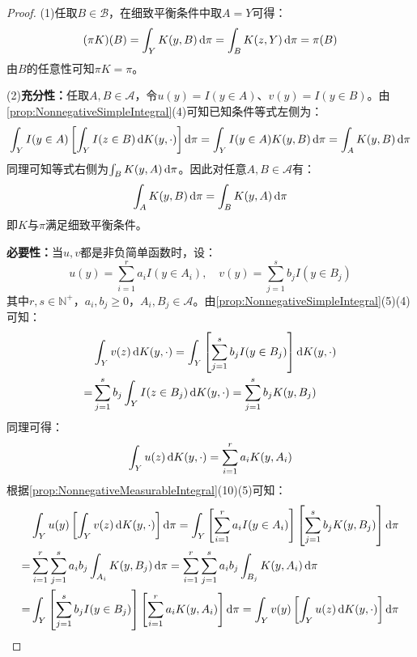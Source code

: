\begin{proof}
	(1)任取$B\in\mathscr{B}$，在细致平衡条件中取$A=Y$可得：
	\begin{equation*}
		(\pi K)(B)=\int_{Y}K(y,B)\mathop{}\!\mathrm{d}\pi=\int_{B}K(z,Y)\mathop{}\!\mathrm{d}\pi=\pi(B)
	\end{equation*}
	由$B$的任意性可知$\pi K=\pi$。\par
	(2)\textbf{充分性：}任取$A,B\in\mathscr{A}$，令$u(y)=I(y\in A)$、$v(y)=I(y\in B)$。由\cref{prop:NonnegativeSimpleIntegral}(4)可知已知条件等式左侧为：
	\begin{equation*}
		\int_{Y}I(y\in A)\left[\int_{Y}I(z\in B)\mathop{}\!\mathrm{d} K(y,\cdot)\right]\mathop{}\!\mathrm{d}\pi=\int_{Y}I(y\in A)K(y,B)\mathop{}\!\mathrm{d}\pi=\int_{A}K(y,B)\mathop{}\!\mathrm{d}\pi
	\end{equation*}
	同理可知等式右侧为$\int_{B}K(y,A)\mathop{}\!\mathrm{d}\pi$。因此对任意$A,B\in\mathscr{A}$有：
	\begin{equation*}
		\int_{A}K(y,B)\mathop{}\!\mathrm{d}\pi=\int_{B}K(y,A)\mathop{}\!\mathrm{d}\pi
	\end{equation*}
	即$K$与$\pi$满足细致平衡条件。\par
	\textbf{必要性：}当$u,v$都是非负简单函数时，设：
	\begin{equation*}
		u(y)=\sum_{i=1}^{r}a_iI(y\in A_i),\quad v(y)=\sum_{j=1}^{s}b_jI(y\in B_j)
	\end{equation*}
	其中$r,s\in\mathbb{N}^+$，$a_i,b_j\geqslant0$，$A_i,B_j\in\mathscr{A}$。由\cref{prop:NonnegativeSimpleIntegral}(5)(4)可知：
	\begin{align*}
		&\int_{Y}v(z)\mathop{}\!\mathrm{d} K(y,\cdot)=\int_{Y}\left[\sum_{j=1}^{s}b_jI(y\in B_j)\right]\mathop{}\!\mathrm{d} K(y,\cdot) \\
		=&\sum_{j=1}^{s}b_j\int_{Y}I(z\in B_j)\mathop{}\!\mathrm{d} K(y,\cdot)=\sum_{j=1}^{s}b_jK(y,B_j)
	\end{align*}
	同理可得：
	\begin{equation*}
		\int_{Y}u(z)\mathop{}\!\mathrm{d} K(y,\cdot)=\sum_{i=1}^{r}a_iK(y,A_i)
	\end{equation*}
	根据\cref{prop:NonnegativeMeasurableIntegral}(10)(5)可知：
	\begin{align*}
		&\int_{Y}u(y)\left[\int_{Y}v(z)\dif K(y,\cdot)\right]\dif\pi=\int_{Y}\left[\sum_{i=1}^{r}a_iI(y\in A_i)\right]\left[\sum_{j=1}^{s}b_jK(y,B_j)\right]\dif\pi \\
		=&\sum_{i=1}^{r}\sum_{j=1}^{s}a_ib_j\int_{A_i}K(y,B_j)\dif\pi=\sum_{i=1}^{r}\sum_{j=1}^{s}a_ib_j\int_{B_j}K(y,A_i)\dif\pi \\
		=&\int_{Y}\left[\sum_{j=1}^{s}b_jI(y\in B_j)\right]\left[\sum_{i=1}^{r}a_iK(y,A_i)\right]\dif\pi=\int_{Y}v(y)\left[\int_{Y}u(z)\dif K(y,\cdot)\right]\dif\pi

\end{align*}
\end{proof}
